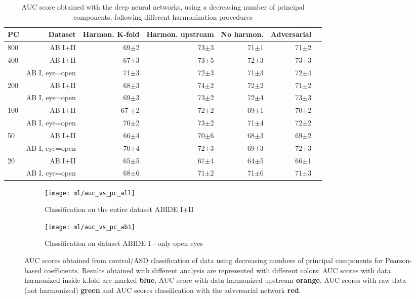 \documentclass[11pt]{report}
\begin{document}
\begin{table}[!htp]\centering
\begin{tabular}{lrrrrrr}\toprule
PC &Dataset &Harmon. K-fold &Harmon. upstream &No harmon. &Adversarial \\\midrule
800 &AB I+II &69$\pm$2 &73$\pm$3 &71$\pm$1 &71$\pm$2 \\
\hline
\multirow{2}{*}{400} &AB I+II &67$\pm$3 &73$\pm$5 &72$\pm$3 &73$\pm$3 \\
&AB I, eye=open &71$\pm$3 &72$\pm$3 &71$\pm$3 &72$\pm$4 \\
\hline
\multirow{2}{*}{200} &AB I+II &68$\pm$3 &74$\pm$2 &72$\pm$2 &71$\pm$2 \\
&AB I, eye=open &69$\pm$3 &73$\pm$2 &72$\pm$4 &73$\pm$3 \\
\hline
\multirow{2}{*}{100} &AB I+II &67 $\pm$2 &72$\pm$2 &69$\pm$1 &70$\pm$2 \\
&AB I, eye=open &70$\pm$2 &73$\pm$2 &71$\pm$4 &72$\pm$2 \\
\hline
\multirow{2}{*}{50} &AB I+II &66$\pm$4 &70$\pm$6 &68$\pm$3 &69$\pm$2 \\
&AB I, eye=open &70$\pm$4 &72$\pm$3 &69$\pm$3 &72$\pm$3 \\
\hline
\multirow{2}{*}{20} &AB I+II &65$\pm$5 &67$\pm$4 &64$\pm$5 &66$\pm$1 \\
&AB I, eye=open &68$\pm$6 &71$\pm$2 &71$\pm$6 &71$\pm$3 \\
\bottomrule
\end{tabular}
\caption{AUC score obtained with the deep neural networks, using a decreasing number of principal components, following different harmonization procedures}
\label{tab:classification_pearson_pca}
\end{table}





\begin{figure}
\centering
\begin{subfigure}{0.4\textwidth}
   \texttt{[image: ml/auc\_vs\_pc\_all]}
   \caption{Classification on the entire dataset ABIDE I+II}
    
\end{subfigure}
\begin{subfigure}{0.4\textwidth}
   \texttt{[image: ml/auc\_vs\_pc\_ab1]}
   \caption{Classification on dataset ABIDE I - only open eyes}
    
\end{subfigure}
\caption{AUC scores obtained from control/ASD classification of data using decreasing numbers of principal components for Pearson-based coefficients.
Results obtained with different analysis are represented with different colors: AUC scores with data harmonized inside k.fold are marked \textbf{blue}, AUC score with data harmonized upstream \textbf{orange}, AUC scores with raw data (not harmonized) \textbf{green} and AUC scores classification with the adversarial network \textbf{red}.
}
\label{fig:classification_pearson_pca}
\end{figure}
\end{document}
